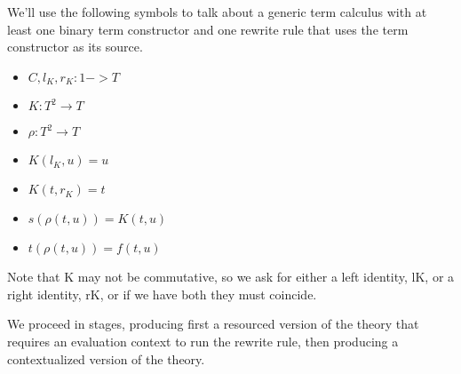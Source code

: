 \documentclass{llncs}
\renewcommand{\:}{\colon}
\begin{document}
We'll use the following symbols to talk about a generic term calculus
with at least one binary term constructor and one rewrite rule that
uses the term constructor as its source.

\begin{itemize}
  \item $C, l_{K}, r_{K} : 1 -> T$
  \item $K : T^{2} \rightarrow T$
  \item $\rho : T^{2} \rightarrow T$             %
  \item $K(l_{K}, u) = u$
  \item $K(t, r_{K}) = t$
  \item $s(\rho(t,u)) = K(t, u)$
  \item $t(\rho(t,u)) = f(t,u)$
\end{itemize}

Note that K may not be commutative, so we ask for either a left
identity, lK, or a right identity, rK, or if we have both they must
coincide.

We proceed in stages, producing first a resourced version of the
theory that requires an evaluation context to run the rewrite rule,
then producing a contextualized version of the theory.



\end{document}

